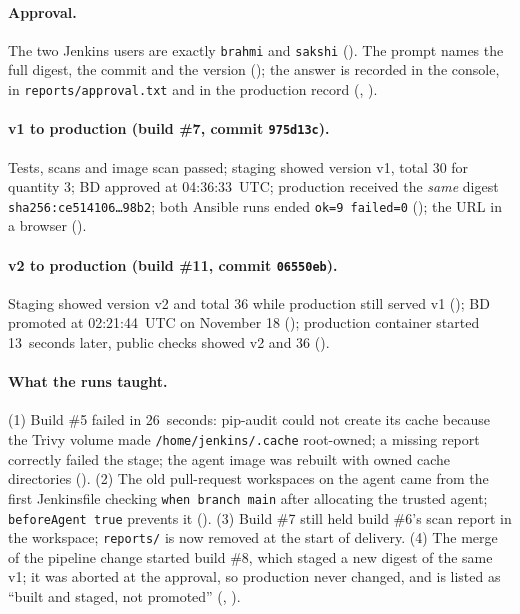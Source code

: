 \paragraph{Approval.} The two Jenkins users are exactly \texttt{brahmi} and \texttt{sakshi} (). The prompt names the full digest, the commit and the version (); the answer is recorded in the console, in \texttt{reports/approval.txt} and in the production record (, ).

\paragraph{v1 to production (build \#7, commit \texttt{975d13c}).} Tests, scans and image scan passed; staging showed version v1, total 30 for quantity 3; BD approved at 04:36:33~UTC; production received the \emph{same}
digest \texttt{sha256:ce514106\ldots 98b2}; both Ansible runs ended \texttt{ok=9 failed=0} (); the URL in a browser ().

\paragraph{v2 to production (build \#11, commit \texttt{06550eb}).} Staging showed version v2 and total 36 while production still served v1 (); BD promoted at 02:21:44~UTC on November 18 (); production container started 13~seconds later,
public checks showed v2 and 36 ().

\paragraph{What the runs taught.} (1) Build \#5 failed in 26~seconds: pip-audit could not create its cache because the Trivy volume made \texttt{/home/jenkins/.cache} root-owned; a missing report correctly failed the stage; the agent image
was rebuilt with owned cache directories (). (2) The old pull-request workspaces on the agent came from the first Jenkinsfile checking \texttt{when branch main} after allocating the trusted agent; \texttt{beforeAgent true} prevents it ().
(3) Build \#7 still held build \#6's scan report in the workspace; \texttt{reports/} is now removed at the start of delivery. (4) The merge of the pipeline change started build \#8, which staged a new digest of the same v1; it was aborted at the approval,
so production never changed, and is listed as ``built and staged, not promoted'' (, ).

